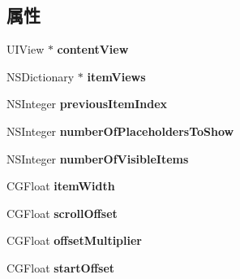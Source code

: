 \subsection*{属性}
\begin{DoxyCompactItemize}
\item 
\hypertarget{categoryi_carousel_07_08_ab46b704167a9abbb36b37be641f7cd7f}{U\-I\-View $\ast$ {\bfseries content\-View}}\label{categoryi_carousel_07_08_ab46b704167a9abbb36b37be641f7cd7f}

\item 
\hypertarget{categoryi_carousel_07_08_a6350bac140b18f6ea8a7e82ff7a50af2}{N\-S\-Dictionary $\ast$ {\bfseries item\-Views}}\label{categoryi_carousel_07_08_a6350bac140b18f6ea8a7e82ff7a50af2}

\item 
\hypertarget{categoryi_carousel_07_08_a8a46ffa69453a69dc19fe9d861d839ff}{N\-S\-Integer {\bfseries previous\-Item\-Index}}\label{categoryi_carousel_07_08_a8a46ffa69453a69dc19fe9d861d839ff}

\item 
\hypertarget{categoryi_carousel_07_08_a1c1b950a899b89d0bbf822cbd261fda3}{N\-S\-Integer {\bfseries number\-Of\-Placeholders\-To\-Show}}\label{categoryi_carousel_07_08_a1c1b950a899b89d0bbf822cbd261fda3}

\item 
\hypertarget{categoryi_carousel_07_08_a91521312e6633004b2942f97e23cc1d3}{N\-S\-Integer {\bfseries number\-Of\-Visible\-Items}}\label{categoryi_carousel_07_08_a91521312e6633004b2942f97e23cc1d3}

\item 
\hypertarget{categoryi_carousel_07_08_ae669de77492811ac8ab4962b2a7ff667}{C\-G\-Float {\bfseries item\-Width}}\label{categoryi_carousel_07_08_ae669de77492811ac8ab4962b2a7ff667}

\item 
\hypertarget{categoryi_carousel_07_08_ac228f51ef5e571a8fa028afb50fed845}{C\-G\-Float {\bfseries scroll\-Offset}}\label{categoryi_carousel_07_08_ac228f51ef5e571a8fa028afb50fed845}

\item 
\hypertarget{categoryi_carousel_07_08_a73ed815ad898d127dff1b31ccd7b096e}{C\-G\-Float {\bfseries offset\-Multiplier}}\label{categoryi_carousel_07_08_a73ed815ad898d127dff1b31ccd7b096e}

\item 
\hypertarget{categoryi_carousel_07_08_af7cb147daa728e5756e4f13395c8ce10}{C\-G\-Float {\bfseries start\-Offset}}\label{categoryi_carousel_07_08_af7cb147daa728e5756e4f13395c8ce10}


\end{DoxyCompactItemize}
